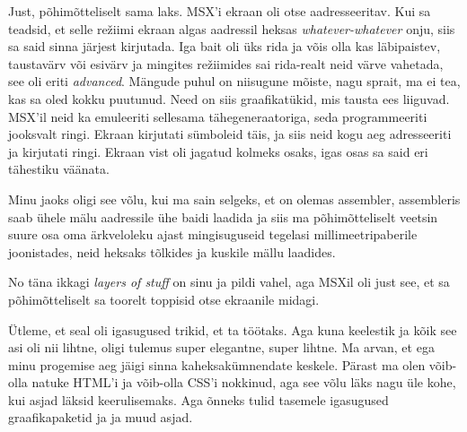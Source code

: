 
Just, põhimõtteliselt sama laks. MSX'i ekraan oli otse aadresseeritav. Kui sa 
teadsid, et selle režiimi ekraan algas aadressil heksas 
\emph{whatever-whatever} onju, siis sa said sinna järjest kirjutada. Iga bait 
oli üks rida ja võis olla kas läbipaistev, taustavärv või esivärv ja mingites 
režiimides sai rida-realt neid värve vahetada, see oli eriti \emph{advanced}. 
Mängude puhul on niisugune mõiste, nagu sprait, ma ei tea, kas sa oled kokku 
puutunud. Need on siis graafikatükid, mis tausta ees liiguvad. MSX'il neid ka 
emuleeriti sellesama tähegeneraatoriga, seda programmeeriti jooksvalt ringi. 
Ekraan kirjutati sümboleid täis, ja siis neid kogu aeg adresseeriti ja 
kirjutati ringi. Ekraan vist oli jagatud kolmeks osaks, igas osas sa said eri 
tähestiku väänata.

Minu jaoks oligi see võlu, kui ma sain selgeks, et on olemas 
assembler, assembleris saab ühele mälu aadressile ühe 
baidi laadida ja siis ma põhimõtteliselt veetsin suure osa oma ärkveloleku 
ajast mingisuguseid tegelasi  millimeetripaberile joonistades, neid heksaks 
tõlkides ja kuskile mällu laadides. 


No täna ikkagi \emph{layers of stuff} on sinu ja pildi vahel, aga MSXil oli 
just see, et sa põhimõtteliselt sa toorelt toppisid otse ekraanile midagi. 


Ütleme, et seal oli igasugused trikid, et ta töötaks. Aga kuna keelestik ja 
kõik see asi oli nii lihtne, oligi tulemus super elegantne, super  lihtne.  Ma 
arvan, et ega minu progemise aeg jäigi sinna kaheksakümnendate keskele. Pärast 
ma olen võib-olla natuke HTML'i ja võib-olla CSS'i nokkinud, aga see võlu läks 
nagu üle kohe, kui asjad läksid keerulisemaks. Aga õnneks tulid tasemele 
igasugused graafikapaketid ja ja muud asjad. 


